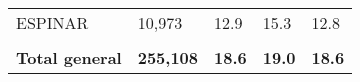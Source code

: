 \begin{tabular}{lllll}
	\cellcolor[HTML]{FF5050}ESPINAR                                & 10,973                                                                & 12.9                                                                             & 15.3                                                                        & 12.8                                                                                \\
	&                                                                       &                                                                                  &                                                                             &                                                                                     \\
	\rowcolor[HTML]{DDEBF7} 
	\textbf{Total   general}                                       & \textbf{255,108}                                                      & \textbf{18.6}                                                                    & \textbf{19.0}                                                               & \textbf{18.6}                                                                      
\end{tabular}